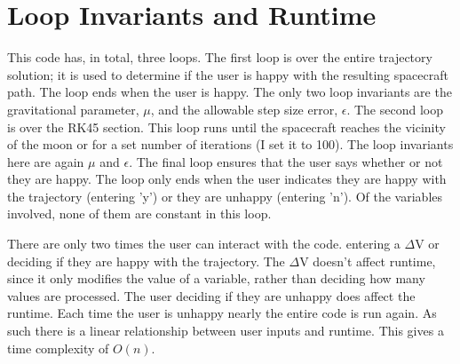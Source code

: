 \documentclass{article}
\begin{document}
\section{Loop Invariants and Runtime}
This code has, in total, three loops. The first loop is over the entire trajectory solution; it is used to determine if the user is happy with the resulting spacecraft path. The loop ends when the user is happy. The only two loop invariants are the gravitational parameter, $\mu$, and the allowable step size error, $\epsilon$. The second loop is over the RK45 section. This loop runs until the spacecraft reaches the vicinity of the moon or for a set number of iterations (I set it to 100). The loop invariants here are again $\mu$ and $\epsilon$. The final loop ensures that the user says whether or not they are happy. The loop only ends when the user indicates they are happy with the trajectory (entering 'y') or they are unhappy (entering 'n'). Of the variables involved, none of them are constant in this loop.

There are only two times the user can interact with the code. entering a $\Delta$V or deciding if they are happy with the trajectory. The $\Delta$V doesn't affect runtime, since it only modifies the value of a variable, rather than deciding how many values are processed. The user deciding if they are unhappy does affect the runtime. Each time the user is unhappy nearly the entire code is run again. As such there is a linear relationship between user inputs and runtime. This gives a time complexity of $O(n)$.
\end{document}

